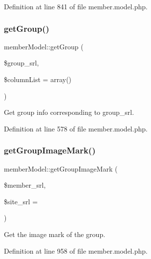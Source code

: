 Definition at line 841 of file member.\+model.\+php.

\hypertarget{classmemberModel_ae12bb2b9c0327902d3166905e3558720}{}\label{classmemberModel_ae12bb2b9c0327902d3166905e3558720} 
\subsubsection{\texorpdfstring{get\+Group()}{getGroup()}}
{\footnotesize\ttfamily member\+Model\+::get\+Group (\begin{DoxyParamCaption}\item[{}]{\$group\+\_\+srl,  }\item[{}]{\$column\+List = {\ttfamily array()} }\end{DoxyParamCaption})}



Get group info corresponding to group\+\_\+srl. 



Definition at line 578 of file member.\+model.\+php.

\hypertarget{classmemberModel_a0a4de94189c084493992feb8d7da5dcb}{}\label{classmemberModel_a0a4de94189c084493992feb8d7da5dcb} 
\subsubsection{\texorpdfstring{get\+Group\+Image\+Mark()}{getGroupImageMark()}}
{\footnotesize\ttfamily member\+Model\+::get\+Group\+Image\+Mark (\begin{DoxyParamCaption}\item[{}]{\$member\+\_\+srl,  }\item[{}]{\$site\+\_\+srl = {} }\end{DoxyParamCaption})}



Get the image mark of the group. 



Definition at line 958 of file member.\+model.\+php.

\hypertarget{classmemberModel_a79bd0adae2d71115335afae1fc8f4e32}{}\label{classmemberModel_a79bd0adae2d71115335afae1fc8f4e32} 
